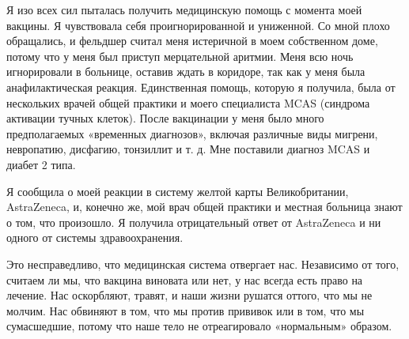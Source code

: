 Я изо всех сил пыталась получить медицинскую помощь с момента моей вакцины. Я
чувствовала себя проигнорированной и униженной. Со мной плохо обращались, и
фельдшер считал меня истеричной в моем собственном доме, потому что у меня был
приступ мерцательной аритмии. Меня всю ночь игнорировали в больнице, оставив
ждать в коридоре, так как у меня была анафилактическая реакция. Единственная
помощь, которую я получила, была от нескольких врачей общей практики и моего
специалиста MCAS (синдрома активации тучных клеток). После вакцинации у меня
было много предполагаемых «временных диагнозов», включая различные виды мигрени,
невропатию, дисфагию, тонзиллит и т. д. Мне поставили диагноз MCAS и диабет 2
типа.

Я сообщила о моей реакции в систему желтой карты Великобритании, AstraZeneca, и,
конечно же, мой врач общей практики и местная больница знают о том, что
произошло. Я получила отрицательный ответ от AstraZeneca и ни одного от системы
здравоохранения.

Это несправедливо, что медицинская система отвергает нас. Независимо от того,
считаем ли мы, что вакцина виновата или нет, у нас всегда есть право на
лечение. Нас оскорбляют, травят, и наши жизни рушатся оттого, что мы не
молчим. Нас обвиняют в том, что мы против прививок или в том, что мы
сумасшедшие, потому что наше тело не отреагировало «нормальным» образом.
